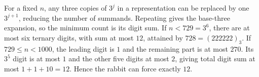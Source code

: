 For a fixed $n$, any three copies of $3^j$ in a representation can be replaced by one $3^{j+1}$, reducing the number of summands. Repeating gives the base-three expansion, so the minimum count is its digit sum. If $n<729=3^6$, there are at most six ternary digits, with sum at most $12$, attained by $728=(222222)_3$. If $729\le n<1000$, the leading digit is $1$ and the remaining part is at most $270$. Its $3^5$ digit is at most $1$ and the other five digits at most $2$, giving total digit sum at most $1+1+10=12$. Hence the rabbit can force exactly $\boxed{12}$.
